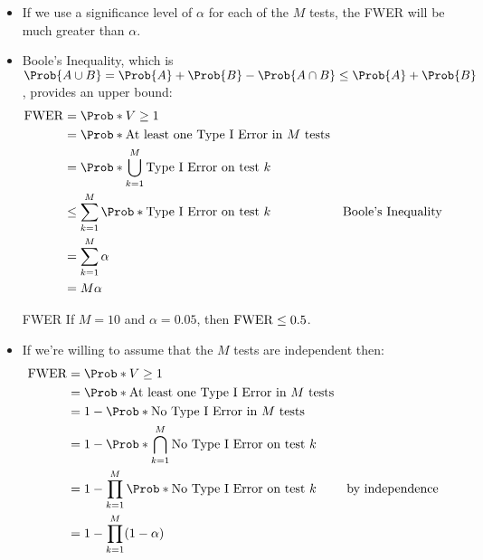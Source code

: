 \begin{itemize}
      \item If we use a significance level of $ \alpha $ for each of the $ M $ tests, the FWER will be much greater
            than $ \alpha $.
      \item Boole's Inequality, which is $ \Prob{A\cup B}=\Prob{A}+\Prob{B}-\Prob{A\cap B}\le \Prob{A}+\Prob{B} $, provides an upper bound:
            \begin{align*}
                  \FWER
                   & =\Prob*{V\ge 1}                                                                             \\
                   & =\Prob*{\text{At least one Type I Error in $ M $ tests}}                                    \\
                   & =\Prob*{\bigcup_{k=1}^M \text{Type I Error on test $ k $}}                                  \\
                   & \le \sum_{k=1}^{M} \Prob*{\text{Type I Error on test $ k $}} &  & \text{Boole's Inequality} \\
                   & =\sum_{k=1}^{M} \alpha                                                                      \\
                   & =M\alpha
            \end{align*}
            \begin{Example}{FWER}{}
                  If $ M=10 $ and $ \alpha=0.05 $, then $ \operatorname{FWER}\le 0.5 $.
            \end{Example}
      \item If we're willing to assume that the $M$ tests are independent then:
            \begin{align*}
                  \FWER
                   & =\Prob*{V\ge 1}                                                                            \\
                   & =\Prob*{\text{At least one Type I Error in $ M $ tests}}                                   \\
                   & =1-\Prob*{\text{No Type I Error in $ M $ tests}}                                           \\
                   & =1-\Prob*{\bigcap_{k=1}^M\text{No Type I Error on test $ k $}}                             \\
                   & =1-\prod_{k=1}^M\Prob*{\text{No Type I Error on test $ k $}}   &  & \text{by independence} \\
                   & =1-\prod_{k=1}^M(1-\alpha)                                                                 \\

\end{align*}
\end{itemize}
